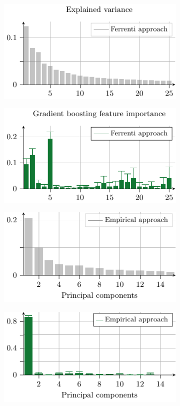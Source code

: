 \documentclass[superscriptaddress,unsortedaddress,
 amsmath,amssymb,
 aps,
]{revtex4-2}
\begin{document}
\begin{figure}[t]
    \centering
    \begin{subfigure}[b]{0.45\textwidth}
        \includegraphics{figure5a}
        \label{fig:01-fi-e}
    \end{subfigure}
    \begin{subfigure}[b]{0.45\textwidth}
        \includegraphics{figure5b}
        \label{fig:01-fi-d}
    \end{subfigure}%
    \hfill
    \begin{subfigure}[b]{0.45\textwidth}
        \includegraphics{figure5c}
        \label{fig:03-fi-e}
        \subcaption{}
    \end{subfigure}
    \begin{subfigure}[b]{0.45\textwidth}
        \includegraphics{figure5d}

\end{subfigure}
\end{figure}
\end{document}
